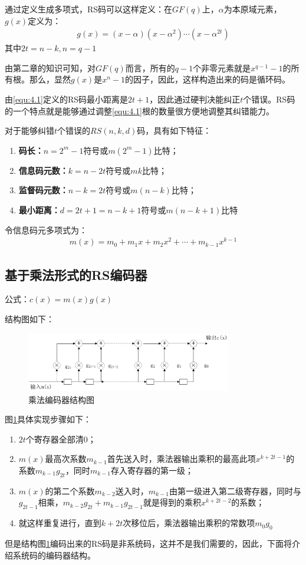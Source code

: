 通过定义生成多项式，RS码可以这样定义：在$GF(q)$上，$\alpha$为本原域元素，$g(x)$定义为：
\begin{eqnarray}
  g(x)=(x-\alpha)(x-\alpha^2)\cdots (x-\alpha^{2t})
  \label{equ:4.1}
\end{eqnarray}
其中$2t=n-k,n=q-1$

由第二章的知识可知，对$GF(q)$而言，所有的$q-1$个非零元素就是$x^{q-1}-1$的所有根。那么，显然$g(x)\mbox{是}x^n-1$的因子，因此，这样构造出来的码是循环码。

由\ref{equ:4.1}定义的RS码最小距离是$2t+1$，因此通过硬判决能纠正$t$个错误。RS码的一个特点就是能够通过调整\ref{equ:4.1}根的数量很方便地调整其纠错能力。

对于能够纠错$t$个错误的$RS(n,k,d)$码，具有如下特征：
\begin{enumerate}
  \item \textbf{码长：}$n=2^m-1$符号或$m(2^m-1)$比特；
  \item \textbf{信息码元数：}$k=n-2t$符号或$mk$比特；
  \item \textbf{监督码元数：}$n-k=2t$符号或$m(n-k)$比特；
  \item \textbf{最小距离：}$d=2t+1=n-k+1$符号或$m(n-k+1)$比特
\end{enumerate}
令信息码元多项式为：
\begin{eqnarray}
  m(x)=m_0+m_1x+m_2x^2+\cdots +m_{k-1}x^{k-1}
  \label{equ:4.2}
\end{eqnarray}
\subsection{基于乘法形式的RS编码器}
公式：$c(x)=m(x)g(x)$

结构图如下：
\begin{figure}[htbp]
  \begin{center}
    \includegraphics[width=0.8\textwidth]{images/RS1.pdf}
  \end{center}
  \caption{乘法编码器结构图}
  \label{fig:4.1}
\end{figure}
图\ref{fig:4.1}具体实现步骤如下：
\begin{enumerate}
  \item $2t$个寄存器全部清0；
  \item
    $m(x)$最高次系数$m_{k-1}$首先送入时，乘法器输出乘积的最高此项$x^{k+2t-1}$的系数$m_{k-1}g_{2t}$，同时$m_{k-1}$存入寄存器的第一级；
  \item
    $m(x)$的第二个系数$m_{k-2}$送入时，$m_{k-1}$由第一级进入第二级寄存器，同时与$g_{2t-1}$相乘，$m_{k-2}g_{2t}+m_{k-1}g_{2t-1}$就是得到的乘积$x^{k+2t-2}$的系数；
  \item 就这样重复进行，直到$k+2t$次移位后，乘法器输出乘积的常数项$m_0g_0$
\end{enumerate}
但是结构图\ref{fig:4.1}编码出来的RS码是非系统码，这并不是我们需要的，因此，下面将介绍系统码的编码器结构。

